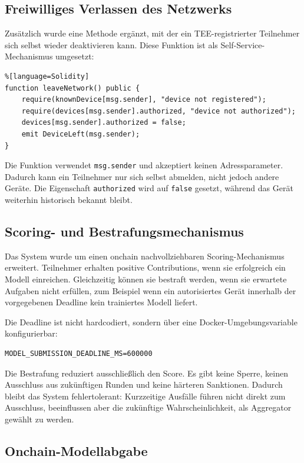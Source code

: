 \subsection{Freiwilliges Verlassen des Netzwerks}

Zusätzlich wurde eine Methode ergänzt, mit der ein TEE-registrierter Teilnehmer sich selbst wieder deaktivieren kann. Diese Funktion ist als Self-Service-Mechanismus umgesetzt:

\begin{lstlisting}%[language=Solidity]
function leaveNetwork() public {
    require(knownDevice[msg.sender], "device not registered");
    require(devices[msg.sender].authorized, "device not authorized");
    devices[msg.sender].authorized = false;
    emit DeviceLeft(msg.sender);
}
\end{lstlisting}

Die Funktion verwendet \texttt{msg.sender} und akzeptiert keinen Adressparameter. Dadurch kann ein Teilnehmer nur sich selbst abmelden, nicht jedoch andere Geräte. Die Eigenschaft \texttt{authorized} wird auf \texttt{false} gesetzt, während das Gerät weiterhin historisch bekannt bleibt.

\subsection{Scoring- und Bestrafungsmechanismus}

Das System wurde um einen onchain nachvollziehbaren Scoring-Mechanismus erweitert. Teilnehmer erhalten positive Contributions, wenn sie erfolgreich ein Modell einreichen. Gleichzeitig können sie bestraft werden, wenn sie erwartete Aufgaben nicht erfüllen, zum Beispiel wenn ein autorisiertes Gerät innerhalb der vorgegebenen Deadline kein trainiertes Modell liefert.

Die Deadline ist nicht hardcodiert, sondern über eine Docker-Umgebungsvariable konfigurierbar:

\begin{lstlisting}
MODEL_SUBMISSION_DEADLINE_MS=600000
\end{lstlisting}

Die Bestrafung reduziert ausschließlich den Score. Es gibt keine Sperre, keinen Ausschluss aus zukünftigen Runden und keine härteren Sanktionen. Dadurch bleibt das System fehlertolerant: Kurzzeitige Ausfälle führen nicht direkt zum Ausschluss, beeinflussen aber die zukünftige Wahrscheinlichkeit, als Aggregator gewählt zu werden.

\subsection{Onchain-Modellabgabe}

